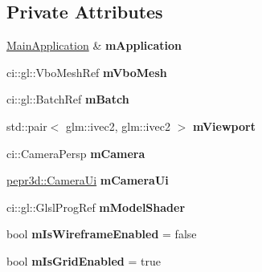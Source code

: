\subsection*{Private Attributes}
\begin{DoxyCompactItemize}
\item 
\mbox{\label{classpepr3d_1_1_model_view_a1ea0d3df781900d19374f7622b309e0f}} 
\mbox{\hyperlink{classpepr3d_1_1_main_application}{Main\+Application}} \& {\bfseries m\+Application}
\item 
\mbox{\label{classpepr3d_1_1_model_view_a6466c60a76a03d6717e39bdf5f3cdb61}} 
ci\+::gl\+::\+Vbo\+Mesh\+Ref {\bfseries m\+Vbo\+Mesh}
\item 
\mbox{\label{classpepr3d_1_1_model_view_ae0b4cc550b89d678a9bb873797e0a5fd}} 
ci\+::gl\+::\+Batch\+Ref {\bfseries m\+Batch}
\item 
\mbox{\label{classpepr3d_1_1_model_view_a25fcb8f18603b1eca917afddc22bd53d}} 
std\+::pair$<$ glm\+::ivec2, glm\+::ivec2 $>$ {\bfseries m\+Viewport}
\item 
\mbox{\label{classpepr3d_1_1_model_view_a5ad014f86cfcd51a23e42b1f8d0b43ba}} 
ci\+::\+Camera\+Persp {\bfseries m\+Camera}
\item 
\mbox{\label{classpepr3d_1_1_model_view_a5fddad8a7098bb3b7a2ce8fe8c8fbbae}} 
\mbox{\hyperlink{classpepr3d_1_1_camera_ui}{pepr3d\+::\+Camera\+Ui}} {\bfseries m\+Camera\+Ui}
\item 
\mbox{\label{classpepr3d_1_1_model_view_a1118d31ff0cbcffd8849fe2618dd0b76}} 
ci\+::gl\+::\+Glsl\+Prog\+Ref {\bfseries m\+Model\+Shader}
\item 
\mbox{\label{classpepr3d_1_1_model_view_a2782075113978240a27c5dc96d6b5ced}} 
bool {\bfseries m\+Is\+Wireframe\+Enabled} = false
\item 
\mbox{\label{classpepr3d_1_1_model_view_af775fd52d68eba85cf50d5ef814acbcc}} 
bool {\bfseries m\+Is\+Grid\+Enabled} = true

\end{DoxyCompactItemize}

